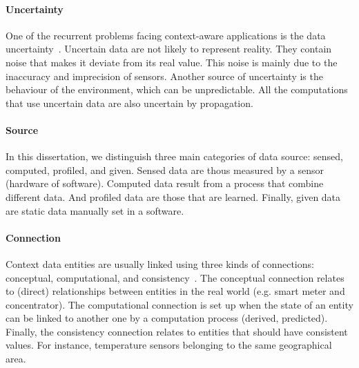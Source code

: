\paragraph{Uncertainty}
One of the recurrent problems facing context-aware applications is the data uncertainty~\cite{DBLP:conf/dagstuhl/LemosGMSALSTVVWBBBBCDDEGGGGIKKLMMMMMNPPSSSSTWW10, DBLP:conf/pervasive/HenricksenIR02, DBLP:journals/comsur/MakrisSS13, DBLP:journals/percom/BettiniBHINRR10}.
Uncertain data are not likely to represent reality. They contain noise that makes it deviate from its real value.
This noise is mainly due to the inaccuracy and imprecision of sensors.
Another source of uncertainty is the behaviour of the environment, which can be unpredictable.
All the computations that use uncertain data are also uncertain by propagation.

\paragraph{Source}
In this dissertation, we distinguish three main categories of data source: sensed, computed, profiled, and given.
Sensed data are thous measured by a sensor (hardware of software).
Computed data result from a process that combine different data.
And profiled data are those that are learned.
Finally, given data are static data manually set in a software.

\paragraph{Connection}
Context data entities are usually linked using three kinds of connections: conceptual, computational, and consistency~\cite{DBLP:conf/pervasive/HenricksenIR02, DBLP:journals/percom/BettiniBHINRR10}.
The conceptual connection relates to  (direct) relationships between entities in the real world (e.g. smart meter and concentrator).
The computational connection is set up when the state of an entity can be linked to another one by a computation process (derived, predicted). 
Finally, the consistency connection relates to entities that should have consistent values. For instance, temperature sensors belonging to the same geographical area.

